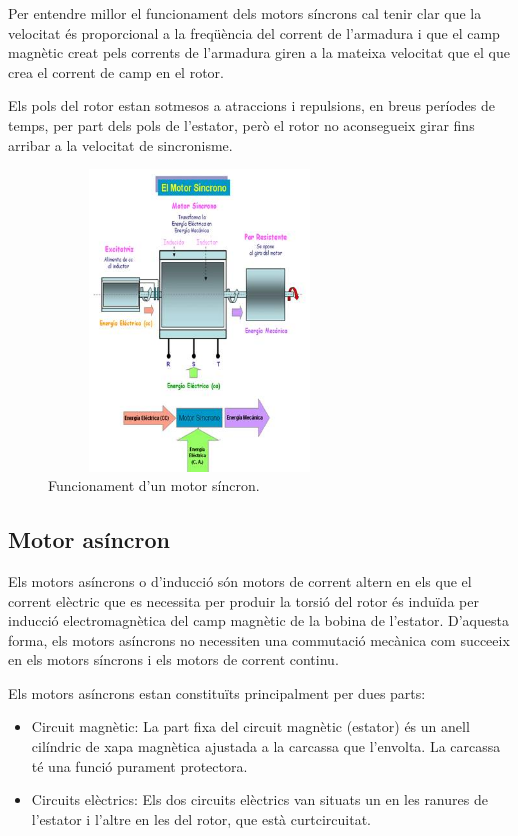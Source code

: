 Per entendre millor el funcionament dels motors síncrons cal tenir clar que la velocitat és proporcional a la freqüència del corrent de l'armadura i que el camp magnètic creat pels corrents de l'armadura giren a la mateixa velocitat que el que crea el corrent de camp en el rotor. 

Els pols del rotor estan sotmesos a atraccions i repulsions, en breus \newline períodes de temps, per part dels pols de l'estator, però el rotor no aconsegueix girar fins arribar a la velocitat de sincronisme. 

\begin{figure}[H]
		\centering
    	\includegraphics[width=8cm,height=8cm]{Motors/funcionamientomotorsincrono.jpg}
     	\caption{Funcionament d'un motor síncron.}
\end{figure}

\subsection{Motor asíncron}
Els motors asíncrons o d'inducció són motors de corrent altern en els que el corrent elèctric que es necessita per produir la torsió del rotor és induïda per inducció electromagnètica del camp magnètic de la bobina de l'estator. D'aquesta forma, els motors asíncrons no necessiten una commutació \newline mecànica com succeeix en els motors síncrons i els motors de corrent continu.

Els motors asíncrons estan constituïts principalment per dues parts: 
\begin{itemize}
    \item Circuit magnètic: La part fixa del circuit magnètic (estator) és un anell cilíndric de xapa magnètica ajustada a la carcassa que l'envolta. La carcassa té una funció purament protectora. 
    \item Circuits elèctrics: Els dos circuits elèctrics van situats un en les ranures de l'estator i l'altre en les del rotor, que està curtcircuitat. 
\end{itemize}

